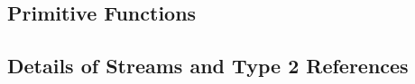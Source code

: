 \subsection{Primitive Functions}
\label{sec:appendix1}



\subsection{Details of Streams and Type 2 References }




   
